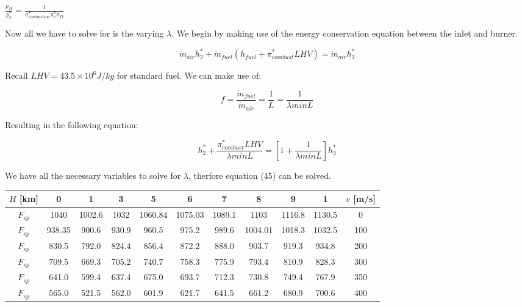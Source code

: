\documentclass[titlepage]{article}
\begin{document}
\begin{enumerate}
\begin{center}
    $\frac{p_{H}}{p_{3}^{*}} = \frac{1}{\sigma_{combustion}^{*} \pi_{c}^{*} \pi_{D}}$
  \end{center}
  
Now all we have to solve for is the varying $\lambda$. We begin by making use of the energy conservation equation between the inlet and burner.

\begin{equation}
  \dot{m}_{air}h_{2}^{*} + \dot{m}_{fuel} \left(h_{fuel} + \pi_{combust}^{*}LHV\right) = \dot{m}_{air}h_{3}^{*} 
\end{equation}

Recall $LHV = 43.5 \times 10^{6} J/kg$ for standard fuel. We can make use of:

\begin{equation}
  f = \frac{\dot{m}_{fuel}}{\dot{m}_{air}} = \frac{1}{L} = \frac{1}{\lambda minL}
\end{equation}

Resulting in the following equation:

\begin{equation}
  h_{2}^{*} + \frac{\pi_{combust}^{*} LHV}{\lambda minL} = \left[1+ \frac{1}{\lambda minL}\right] h_{3}^{*}
\end{equation}

We have all the necessary variables to solve for $\lambda$, therfore equation (45) can be solved.

\begin{center}
  \begin{tabular}{c c c c c c c c c c c }
    \hline
    \textbf{$H$ [km]} & 0 & 1 & 3 & 5 & 6 & 7 & 8 & 9 & 1 & \textbf{$v$ [m/s]} \\
    \hline
    $F_{sp}$ & 1040	&1002.6	&1032	&1060.84	&1075.03	&1089.1	&1103	&1116.8	&1130.5 & 0 \\
    \hline
    $F_{sp}$ & 938.35	&900.6&	930.9	&960.5	&975.2	&989.6	&1004.01	&1018.3	&1032.5& 100 \\
    \hline
    $F_{sp}$ & 830.5	&792.0	&824.4	&856.4	&872.2	&888.0	&903.7	&919.3	&934.8& 200 \\
    \hline
    $F_{sp}$ & 709.5	&669.3	&705.2	&740.7	&758.3	&775.9	&793.4	&810.9	&828.3& 300 \\
    \hline
    $F_{sp}$ & 641.0	&599.4	&637.4	&675.0	& 693.7	&712.3	&730.8	&749.4	&767.9& 350 \\
    \hline
    $F_{sp}$ & 565.0	&521.5	&562.0	&601.9	&621.7	&641.5	&661.2	&680.9	&700.6& 400 \\
    \hline
  \end{tabular}
\end{center}


\end{enumerate}
\end{document}
